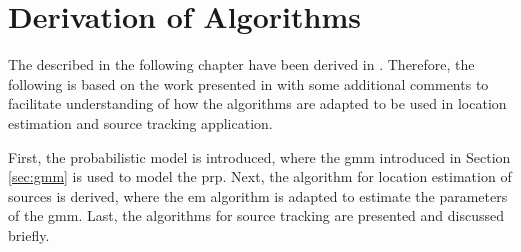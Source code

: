 \chapter{Derivation of Algorithms}
\label{chap:algorithms}

The described in the following chapter have been derived in \cite{Schwartz2014}. Therefore, the following is based on the work presented in \cite{Schwartz2014} with some additional comments to facilitate understanding of how the algorithms are adapted to be used in location estimation and source tracking application.


First, the probabilistic model is introduced, where the \gls{gmm} introduced in Section \ref{sec:gmm} is used to model the \gls{prp}. Next, the algorithm for location estimation of sources is derived, where the \gls{em} algorithm is adapted to estimate the parameters of the \gls{gmm}. Last, the algorithms for source tracking are presented and discussed briefly.
